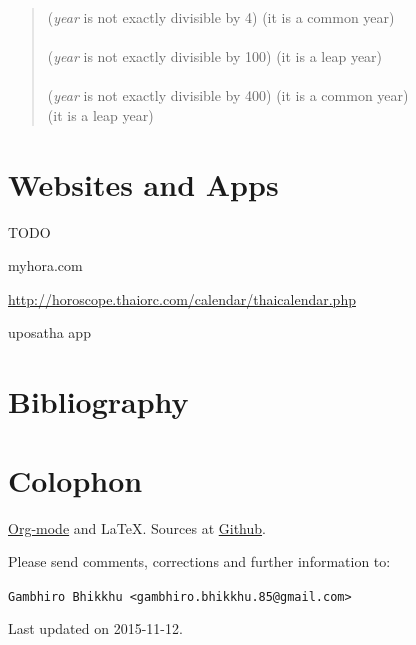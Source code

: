\documentclass[11pt,oneside]{memoir-article}
\begin{document}
\begin{quote}
 (\emph{year} is not exactly divisible by 4)  (it is a common year)\\
\\
 (\emph{year} is not exactly divisible by 100)  (it is a leap year)\\
\\
 (\emph{year} is not exactly divisible by 400)  (it is a common year)\\
 (it is a leap year)
\autocite{wp-leap-year}
\end{quote}

\backmatter

\chapter{Websites and Apps}
\label{sec-8}

TODO

myhora.com

\url{http://horoscope.thaiorc.com/calendar/thaicalendar.php}

uposatha app

\chapter{Bibliography}
\label{sec-9}
\label{bibliography}

\printbibliography

\chapter{Colophon}
\label{sec-10}

\href{http://orgmode.org/}{Org-mode} and \LaTeX. Sources at \href{https://github.com/profound-labs/calculating-the-uposatha-moondays/}{Github}.

Please send comments, corrections and further information to:

\texttt{Gambhiro Bhikkhu <gambhiro.bhikkhu.85@gmail.com>}

Last updated on 2015-11-12.





\end{document}

